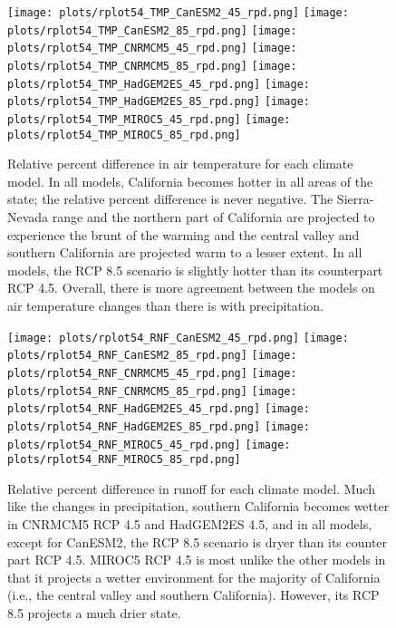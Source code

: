\begin{figure}
    \texttt{[image: plots/rplot54\_TMP\_CanESM2\_45\_rpd.png]}\hfill
    \texttt{[image: plots/rplot54\_TMP\_CanESM2\_85\_rpd.png]}\hfill
    \texttt{[image: plots/rplot54\_TMP\_CNRMCM5\_45\_rpd.png]}\hfill
    \texttt{[image: plots/rplot54\_TMP\_CNRMCM5\_85\_rpd.png]}
    \texttt{[image: plots/rplot54\_TMP\_HadGEM2ES\_45\_rpd.png]}\hfill
    \texttt{[image: plots/rplot54\_TMP\_HadGEM2ES\_85\_rpd.png]}\hfill
    \texttt{[image: plots/rplot54\_TMP\_MIROC5\_45\_rpd.png]}\hfill
    \texttt{[image: plots/rplot54\_TMP\_MIROC5\_85\_rpd.png]}
    \caption[Relative percent difference in air temperature for each climate model.]{Relative percent difference in air temperature for each climate model. In all models, California becomes hotter in all areas of the state; the relative percent difference is never negative. The Sierra-Nevada range and the northern part of California are projected to experience the brunt of the warming and the central valley and southern California are projected warm to a lesser extent. In all models, the RCP 8.5 scenario is slightly hotter than its counterpart RCP 4.5. Overall, there is more agreement between the models on air temperature changes than there is with precipitation.}
    \label{fig:rpdmap_tmp}
\end{figure}

\begin{figure}
    \texttt{[image: plots/rplot54\_RNF\_CanESM2\_45\_rpd.png]}\hfill
    \texttt{[image: plots/rplot54\_RNF\_CanESM2\_85\_rpd.png]}\hfill
    \texttt{[image: plots/rplot54\_RNF\_CNRMCM5\_45\_rpd.png]}\hfill
    \texttt{[image: plots/rplot54\_RNF\_CNRMCM5\_85\_rpd.png]}
    \texttt{[image: plots/rplot54\_RNF\_HadGEM2ES\_45\_rpd.png]}\hfill
    \texttt{[image: plots/rplot54\_RNF\_HadGEM2ES\_85\_rpd.png]}\hfill
    \texttt{[image: plots/rplot54\_RNF\_MIROC5\_45\_rpd.png]}\hfill
    \texttt{[image: plots/rplot54\_RNF\_MIROC5\_85\_rpd.png]}
    \caption[Relative percent difference in runoff for each climate model.]{Relative percent difference in runoff for each climate model. Much like the changes in precipitation, southern California becomes wetter in CNRMCM5 RCP 4.5 and HadGEM2ES 4.5, and in all models, except for CanESM2, the RCP 8.5 scenario is dryer than its counter part RCP 4.5. MIROC5 RCP 4.5 is most unlike the other models in that it projects a wetter environment for the majority of California (i.e., the central valley and southern California). However, its RCP 8.5 projects a much drier state.}
    \label{fig:rpdmap_rnf}
\end{figure}

